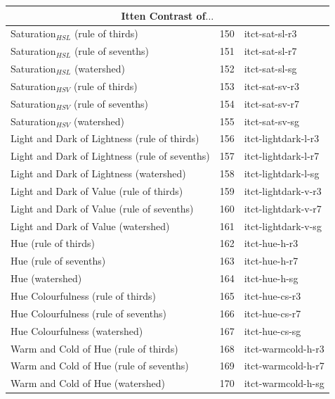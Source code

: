 \documentclass[11pt,a4paper,draft]{report}
\begin{document}
\begin{center}
\begin{longtable}{|l|c|l|}
\midrule
\multicolumn{3}{c}{Itten Contrast of$\ldots$} \\
\midrule
Saturation$_{HSL}$ (rule of thirds)              & 150 & itct-sat-sl-r3      \\
Saturation$_{HSL}$ (rule of sevenths)            & 151 & itct-sat-sl-r7      \\
Saturation$_{HSL}$ (watershed)                   & 152 & itct-sat-sl-sg      \\
Saturation$_{HSV}$ (rule of thirds)              & 153 & itct-sat-sv-r3      \\
Saturation$_{HSV}$ (rule of sevenths)            & 154 & itct-sat-sv-r7      \\
Saturation$_{HSV}$ (watershed)                   & 155 & itct-sat-sv-sg      \\
Light and Dark of Lightness (rule of thirds)     & 156 & itct-lightdark-l-r3 \\
Light and Dark of Lightness (rule of sevenths)   & 157 & itct-lightdark-l-r7 \\
Light and Dark of Lightness (watershed)          & 158 & itct-lightdark-l-sg \\
Light and Dark of Value (rule of thirds)         & 159 & itct-lightdark-v-r3 \\
Light and Dark of Value (rule of sevenths)       & 160 & itct-lightdark-v-r7 \\
Light and Dark of Value (watershed)              & 161 & itct-lightdark-v-sg \\
Hue (rule of thirds)                             & 162 & itct-hue-h-r3       \\
Hue (rule of sevenths)                           & 163 & itct-hue-h-r7       \\
Hue (watershed)                                  & 164 & itct-hue-h-sg       \\
Hue Colourfulness (rule of thirds)               & 165 & itct-hue-cs-r3      \\
Hue Colourfulness (rule of sevenths)             & 166 & itct-hue-cs-r7      \\
Hue Colourfulness (watershed)                    & 167 & itct-hue-cs-sg      \\
Warm and Cold of Hue (rule of thirds)            & 168 & itct-warmcold-h-r3  \\
Warm and Cold of Hue (rule of sevenths)          & 169 & itct-warmcold-h-r7  \\
Warm and Cold of Hue (watershed)                 & 170 & itct-warmcold-h-sg  \\

\end{longtable}
\end{center}
\end{document}

